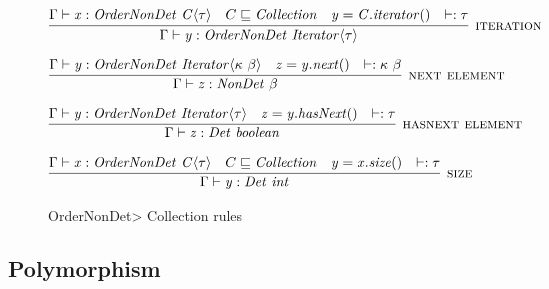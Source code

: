 \begin{figure}
    $\infer[\rulename{iteration}]
    {\Gamma \vdash \|y| : \|OrderNonDet\ Iterator|\angles{\tau}}
    {\Gamma \vdash \|x| : \|OrderNonDet \ C\angles{\tau}|
    & C \sqsubseteq \|Collection|
    & \|y = C.iterator()|
    & \wellformed{\tau}
    }$

    \bigskip
    
    $\infer[\rulename{next element}]
    {\Gamma \vdash \|z| : \|NonDet \ \beta|}
    {\Gamma \vdash \|y| : \|OrderNonDet \ Iterator\angles{\kappa \ \beta}|
        & \|z = y.next()|
        & \wellformed{\kappa \ \beta}
    }$

    \bigskip
    
    $\infer[\rulename{hasnext element}]
    {\Gamma \vdash \|z| : \|Det \ boolean|}
    {\Gamma \vdash \|y| : \|OrderNonDet \ Iterator\angles{\tau}|
        & \|z = y.hasNext()|
        & \wellformed{\tau}
    }$

    \bigskip

    $\infer[\rulename{size}]
    {\Gamma \vdash \|y| : \|Det \ int|}
    {\Gamma \vdash \|x| : \|OrderNonDet \ C\angles{\tau}|
        & C \sqsubseteq \|Collection|
        & \|y = x.size()|
        & \wellformed{\tau}
    }$
\caption{\<OrderNonDet> Collection rules}
\label{fig-ordernondet-rules}
\end{figure}

\subsection{Polymorphism}\label{polymorphism}

